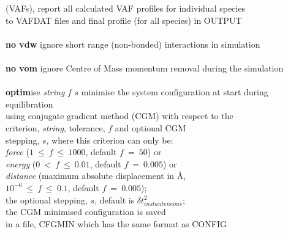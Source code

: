 \begin{tabbing}
\>                                              \> (VAFs), report all calculated VAF profiles for individual species \\
\>                                              \> to VAFDAT files and final profile (for all species) in OUTPUT \\
\>                                              \> \\
\> {\bf no vdw}                                 \> ignore short range (non-bonded) interactions in simulation \\
\>                                              \> \\
\> {\bf no vom}                                 \> ignore Centre of Mass momentum removal during the simulation \\
\>                                              \> \\
\> {\bf optim}ise {\em string} $f$ $s$          \> minimise the system configuration at start during equilibration \\
\>                                              \> using conjugate gradient method (CGM) with respect to the \\
\>                                              \> criterion, {\em string}, tolerance, $f$ and optional CGM \\
\>                                              \> stepping, $s$, where this criterion can only be: \\
\>                                              \> {\em force} ($1~\le~f~\le~1000$, default $f~=~50$) or \\
\>                                              \> {\em energy} ($0~<~f~\le~0.01$, default $f~=~0.005$) or \\
\>                                              \> {\em distance} (maximum absolute displacement in \AA, \\
\>                                              \> $10^{-6}~\le~f~\le~0.1$, default $f~=~0.005$); \\
\>                                              \> the optional stepping, $s$, default is $\delta t_{instanteneous}^{2}$; \\
\>                                              \> the CGM minimised configuration is saved \\
\>                                              \> in a file, CFGMIN which has the same format as CONFIG \\
\>                                              \> \\

\end{tabbing}
